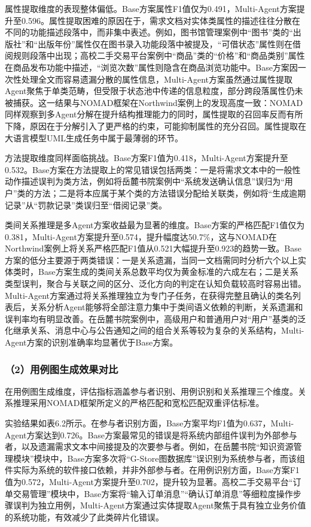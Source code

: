 属性提取维度的表现整体偏低。Base方案属性F1值仅为0.491，Multi-Agent方案提升至0.596。属性提取困难的原因在于，需求文档对实体类属性的描述往往分散在不同的功能描述段落中，而非集中表述。例如，图书馆管理案例中“图书”类的“出版社”和“出版年份”属性仅在图书录入功能段落中被提及，“可借状态”属性则在借阅规则段落中出现；高校二手交易平台案例中“商品”类的“价格”和“商品类别”属性在商品发布功能中描述，“浏览次数”属性则隐含在商品浏览功能中。Base方案因一次性处理全文而容易遗漏分散的属性信息，Multi-Agent方案虽然通过属性提取Agent聚焦于单类范畴，但受限于状态池中传递的信息粒度，部分跨段落属性仍未被捕获。这一结果与NOMAD框架在Northwind案例上的发现高度一致：NOMAD同样观察到多Agent分解在提升结构推理能力的同时，属性提取的召回率反而有所下降，原因在于分解引入了更严格的约束，可能抑制属性的充分召回。属性提取在大语言模型UML生成任务中属于最薄弱的环节。

方法提取维度同样面临挑战。Base方案F1值为0.418，Multi-Agent方案提升至0.532。Base方案在方法提取上的常见错误包括两类：一是将需求文本中的一般性动作描述误判为类方法，例如将岳麓书院案例中“系统发送确认信息”误归为“用户”类的方法；二是将本应属于某个类的方法错误分配给关联类，例如将“生成逾期记录”从“罚款记录”类误归至“借阅记录”类。

类间关系推理是多Agent方案收益最为显著的维度。Base方案的严格匹配F1值仅为0.381，Multi-Agent方案提升至0.574，提升幅度达50.7\%，这与NOMAD在Northwind案例上将关系严格匹配F1值从0.521大幅提升至0.923的趋势一致。Base方案的低分主要源于两类错误：一是关系遗漏，当同一文档需同时分析六个以上实体类时，Base方案生成的类间关系总数平均仅为黄金标准的六成左右；二是关系类型误判，聚合与关联之间的区分、泛化方向的判定在认知负载较高时容易出错。Multi-Agent方案通过将关系推理独立为专门子任务，在获得完整且确认的类名列表后，关系分析Agent能够将全部注意力集中于类间语义依赖的判断，关系遗漏和误判率均有明显改善。在岳麓书院案例中，高级用户和普通用户对“用户”基类的泛化继承关系、消息中心与公告通知之间的组合关系等较为复杂的关系结构，Multi-Agent方案的识别准确率均显著优于Base方案。

\subsubsection{（2）用例图生成效果对比}

在用例图生成维度，评估指标涵盖参与者识别、用例识别和关系推理三个维度。关系推理采用NOMAD框架所定义的严格匹配和宽松匹配双重评估标准。

实验结果如表6.2所示。在参与者识别方面，Base方案平均F1值为0.637，Multi-Agent方案达到0.726。Base方案最常见的错误是将系统内部组件误判为外部参与者，以及遗漏需求文本中间接提及的次要参与者。例如，在岳麓书院“知识资源管理模块”模块中，Base方案多次将“G-Store图数据库”误识别为系统参与者，而该组件实际为系统的软件接口依赖，并非外部参与者。在用例识别方面，Base方案F1值为0.572，Multi-Agent方案提升至0.702，提升较为显著。高校二手交易平台“订单交易管理”模块中，Base方案将“输入订单消息”“确认订单消息”等细粒度操作步骤误判为独立用例，Multi-Agent方案通过实体提取Agent聚焦于具有独立业务价值的系统功能，有效减少了此类碎片化错误。

